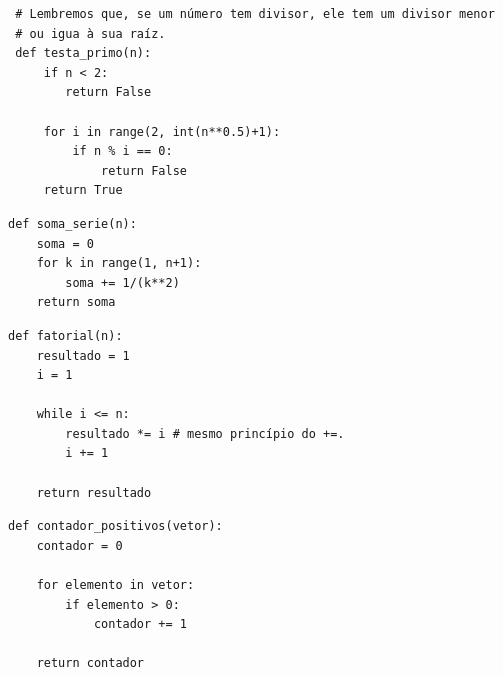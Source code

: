 \documentclass[../numerical_methods.tex]{subfiles}
\begin{document}
\begin{listing}[H]
	\caption{Verificar se é primo.}
	\begin{verbatim}
 # Lembremos que, se um número tem divisor, ele tem um divisor menor 
 # ou igua à sua raíz.
 def testa_primo(n):
     if n < 2: 
        return False

     for i in range(2, int(n**0.5)+1):
         if n % i == 0:
             return False
     return True
 \end{verbatim}

	\caption{Soma da série.}
	\begin{verbatim}
def soma_serie(n): 
    soma = 0 
    for k in range(1, n+1):
        soma += 1/(k**2)
    return soma 
\end{verbatim}

	\caption{Fatorial usando \texttt{while}.}
	\begin{verbatim}
def fatorial(n):
    resultado = 1 
    i = 1

    while i <= n: 
        resultado *= i # mesmo princípio do +=.
        i += 1

    return resultado 
\end{verbatim}
\end{listing}

\begin{listing}
	\caption{Contar elementos positivos de um vetor.}
	\begin{verbatim}
def contador_positivos(vetor):
    contador = 0 

    for elemento in vetor:
        if elemento > 0: 
            contador += 1 

    return contador 
\end{verbatim}
\end{listing}
\end{document}
